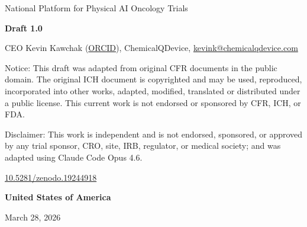 \thispagestyle{coverpage}
\setlength{\headheight}{32pt}

\vspace*{4cm}

\begin{center}
    {\Huge National Platform for Physical AI Oncology Trials}\\

    \vspace{2cm}

    {\bf Draft 1.0}\\

    \vspace{0.5cm}

    CEO Kevin Kawchak
    (\href{https://orcid.org/0009-0007-5457-8667}{ORCID}),
    ChemicalQDevice,
    \href{mailto:kevink@chemicalqdevice.com}{kevink@chemicalqdevice.com}\\

    \vspace{0.5cm}

    Notice: This draft was adapted from original CFR documents in the public
    domain. The original ICH document is copyrighted and may be used,
    reproduced, incorporated into other works, adapted, modified, translated
    or distributed under a public license. This current work is not endorsed
    or sponsored by CFR, ICH, or FDA.\\

    \vspace{0.5cm}

    Disclaimer: This work is independent and is not endorsed, sponsored, or
    approved by any trial sponsor, CRO, site, IRB, regulator, or medical
    society; and was adapted using Claude Code Opus 4.6.\\

    \vspace{0.5cm}

    \href{https://doi.org/10.5281/zenodo.19244918}{10.5281/zenodo.19244918}\\

    \vspace{3cm}

    {\bf United States of America}\\

    \vspace{3cm}

    March 28, 2026

\end{center}

\newpage
\setlength{\headheight}{32pt}
